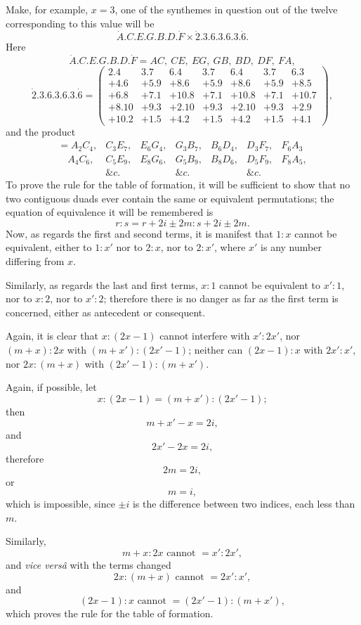 \documentclass[11pt]{article}
\newcommand{\sourcepage}[1]{\marginpar{\scriptsize p.~#1}}
\newcommand{\dotter}[1]{\dot{#1}}
\begin{document}
{{\sourcepage{101}
Make, for example, $x=3$, one of the synthemes in question out of the twelve corresponding to this value will be
\[
\dotter A.C.E.G.B.D.\dotter F\times \dotter2.3.6.3.6.3.\dotter6.
\]
Here
\[
\dotter A.C.E.G.B.D.\dotter F = AC,\ CE,\ EG,\ GB,\ BD,\ DF,\ FA,
\]
\[
\dotter2.3.6.3.6.3.\dotter6=
\left(\begin{array}{rrrrrrr}
2.4&3.7&6.4&3.7&6.4&3.7&6.3\\
+4.6&+5.9&+8.6&+5.9&+8.6&+5.9&+8.5\\
+6.8&+7.1&+10.8&+7.1&+10.8&+7.1&+10.7\\
+8.10&+9.3&+2.10&+9.3&+2.10&+9.3&+2.9\\
+10.2&+1.5&+4.2&+1.5&+4.2&+1.5&+4.1
\end{array}\right),
\]
and the product
\[
\begin{array}{lllllll}
= A_2C_4,&C_3E_7,&E_6G_4,&G_3B_7,&B_6D_4,&D_3F_7,&F_6A_3\\
\quad A_4C_6,&C_5E_9,&E_8G_6,&G_5B_9,&B_8D_6,&D_5F_9,&F_8A_5,\\
&\&c.&&\&c.&&\&c.
\end{array}
\]
To prove the rule for the table of formation, it will be sufficient to show that no two contiguous duads ever contain the same or equivalent permutations; the equation of equivalence it will be remembered is
\[
r:s=r+2i\pm2m:s+2i\pm2m.
\]
Now, as regards the first and second terms, it is manifest that $1:x$ cannot be equivalent, either to $1:x'$ nor to $2:x$, nor to $2:x'$, where $x'$ is any number differing from $x$.

Similarly, as regards the last and first terms, $x:1$ cannot be equivalent to $x':1$, nor to $x:2$, nor to $x':2$; therefore there is no danger as far as the first term is concerned, either as antecedent or consequent.

Again, it is clear that $x:(2x-1)$ cannot interfere with $x':2x'$, nor $(m+x):2x$ with $(m+x'):(2x'-1)$; neither can $(2x-1):x$ with $2x':x'$, nor $2x:(m+x)$ with $(2x'-1):(m+x')$.

Again, if possible, let
\[
x:(2x-1)=(m+x'):(2x'-1);
\]
then
\[
m+x'-x=2i,
\]
and
\[
2x'-2x=2i,
\]
therefore
\[
2m=2i,
\]
or
\[
m=i,
\]
which is impossible, since $\pm i$ is the difference between two indices, each less than $m$.

\sourcepage{102}
Similarly,
\[
m+x:2x\text{ cannot }=x':2x',
\]
and \emph{vice vers\^a} with the terms changed
\[
2x:(m+x)\text{ cannot }=2x':x',
\]
and
\[
(2x-1):x\text{ cannot }=(2x'-1):(m+x'),
\]
which proves the rule for the table of formation.

}}
\end{document}
